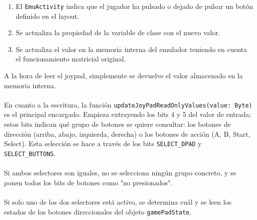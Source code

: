 \begin{enumerate}
    \item El \texttt{EmuActivity} indica que el jugador ha pulsado o dejado de pulsar un botón definido en el layout.
    \item Se actualiza la propiedad de la variable de clase con el nuevo valor.
    \item Se actualiza el valor en la memoria interna del emulador teniendo en cuenta el funcionamiento matricial original.
\end{enumerate}

A la hora de leer el joypad, simplemente se devuelve el valor almacenado en la memoria interna.
\\\\
En cuanto a la escritura, la función \texttt{updateJoyPadReadOnlyValues(value: Byte)} es el principal encargado. Empieza extrayendo los bits 4 y 5 del valor de entrada; estos bits indican qué grupo de botones se quiere consultar: los botones de dirección (arriba, abajo, izquierda, derecha) o los botones de acción (A, B, Start, Select). Esta selección se hace a través de los bits \texttt{SELECT\_DPAD} y \texttt{SELECT\_BUTTONS}.
\\\\
Si ambos selectores son iguales, no se selecciona ningún grupo concreto, y se ponen todos los bits de botones como "no presionados".
\\\\
Si solo uno de los dos selectores está activo, se determina cuál y se leen los estados de los botones direccionales del objeto \texttt{gamePadState}.

